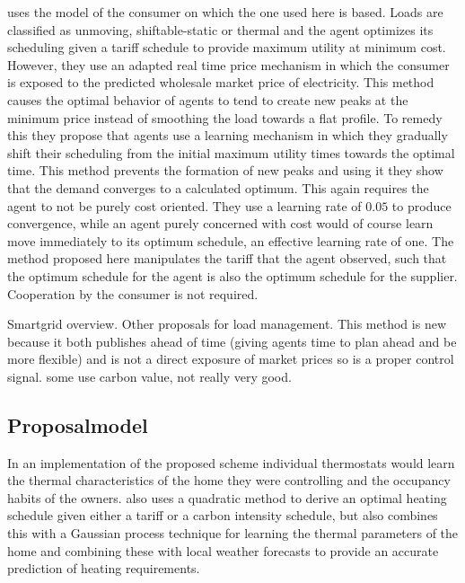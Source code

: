 \documentclass[a4paper, 10 pt, conference]{ieeeconf}  %
\begin{document}
\cite{ramchurn2011agent} uses the model of the consumer on which the one used here is based. Loads are classified as unmoving, shiftable-static or thermal and the agent optimizes its scheduling given a tariff schedule to provide maximum utility at minimum cost. However, they use an adapted real time price mechanism in which the consumer is exposed to the predicted wholesale market price of electricity. This method causes the optimal behavior of agents to tend to create new peaks at the minimum price instead of smoothing the load towards a flat profile. To remedy this they propose that agents use a learning mechanism in which they gradually shift their scheduling from the initial maximum utility times towards the optimal time. This method prevents the formation of new peaks and using it they show that the demand converges to a calculated optimum. This again requires the agent to not be purely cost oriented. They use a learning rate of $0.05$ to produce convergence, while an agent purely concerned with cost would of course learn move immediately to its optimum schedule, an effective learning rate of one. The method proposed here manipulates the tariff that the agent observed, such that the optimum schedule for the agent is also the optimum schedule for the supplier. Cooperation by the consumer is not required.

Smartgrid overview. Other proposals for load management. This method is new because it both publishes ahead of time (giving agents time to plan ahead and be more flexible) and is not a direct exposure of market prices so is a proper control signal. some use carbon value, not really very good.

\subsection{Proposalmodel}
In an implementation of the proposed scheme individual thermostats would learn the thermal characteristics of the home they were controlling and the occupancy habits of the owners. \cite{rogers2011adaptive} also uses a quadratic method to derive an optimal heating schedule given either a tariff or a carbon intensity schedule, but also combines this with a Gaussian process technique for learning the thermal parameters of the home and combining these with local weather forecasts to provide an accurate prediction of heating requirements.
\end{document}
